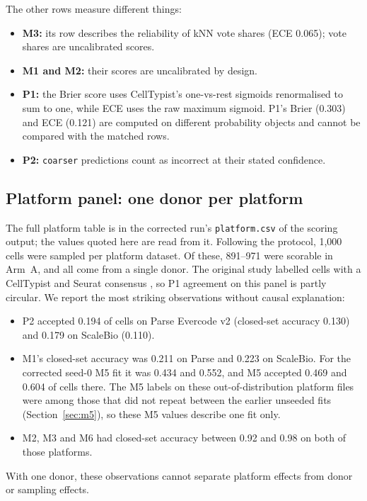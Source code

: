 \documentclass[11pt]{article}
\begin{document}
The other rows measure different things:
\begin{itemize}
\item \textbf{M3:} its row describes the reliability of kNN vote shares (ECE 0.065); vote shares are uncalibrated scores.
\item \textbf{M1 and M2:} their scores are uncalibrated by design.
\item \textbf{P1:} the Brier score uses CellTypist's one-vs-rest sigmoids renormalised to sum to one, while ECE uses the raw maximum sigmoid. P1's Brier (0.303) and ECE (0.121) are computed on different probability objects and cannot be compared with the matched rows.
\item \textbf{P2:} \texttt{coarser} predictions count as incorrect at their stated confidence.
\end{itemize}

\subsection{Platform panel: one donor per platform}

The full platform table is in the corrected run's \nolinkurl{platform.csv} of the scoring output; the values quoted here are read from it. Following the protocol, 1{,}000 cells were sampled per platform dataset. Of these, 891--971 were scorable in Arm~A, and all come from a single donor. The original study labelled cells with a CellTypist and Seurat consensus \citep{desimone2025platforms}, so P1 agreement on this panel is partly circular. We report the most striking observations without causal explanation:
\begin{itemize}
\item P2 accepted 0.194 of cells on Parse Evercode v2 (closed-set accuracy 0.130) and 0.179 on ScaleBio (0.110).
\item M1's closed-set accuracy was 0.211 on Parse and 0.223 on ScaleBio. For the corrected seed-0 M5 fit it was 0.434 and 0.552, and M5 accepted 0.469 and 0.604 of cells there. The M5 labels on these out-of-distribution platform files were among those that did not repeat between the earlier unseeded fits (Section~\ref{sec:m5}), so these M5 values describe one fit only.
\item M2, M3 and M6 had closed-set accuracy between 0.92 and 0.98 on both of those platforms.
\end{itemize}
With one donor, these observations cannot separate platform effects from donor or sampling effects.
\end{document}
